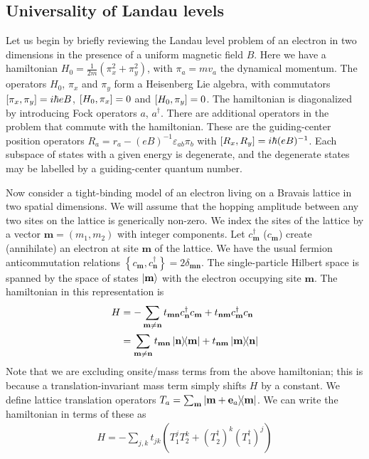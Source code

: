 \documentclass[aps,prb,twocolumn,letterpaper,twoside,nobalancelastpage,groupedaddress,amsmath,amssymb,floatfix,citeautoscript]{revtex4-1}
\begin{document}
\subsection{Universality of Landau levels}
Let us begin by briefly reviewing the Landau level problem of an electron in two dimensions in the presence of a uniform magnetic field $B$. Here we have a hamiltonian $H_0 = \frac{1}{2m}\left(\pi_x^2 + \pi_y^2\right)$, with $\pi_a = m v_a$ the dynamical momentum. The operators $H_0$, $\pi_x$ and $\pi_y$ form a Heisenberg Lie algebra, with commutators $\comm{\pi_x}{\pi_y} = i\hbar e B$, $\comm{H_0}{\pi_x} = 0$ and $\comm{H_0}{\pi_y} = 0$. The hamiltonian is diagonalized by introducing Fock operators $a$, $a^{\dagger}$. There are additional operators in the problem that commute with the hamiltonian. These are the guiding-center position operators $R_a = r_a - (eB)^{-1}\varepsilon_{ab}\pi_b$ with $\comm{R_x}{R_y} = i\hbar(eB)^{-1}$. Each subspace of states with a given energy is degenerate, and the degenerate states may be labelled by a guiding-center quantum number.

Now consider a tight-binding model of an electron living on a Bravais lattice in two spatial dimensions. 
We will assume that the hopping amplitude between any two sites on the lattice is generically non-zero. We index the sites of the lattice by a vector $\mathbf{m} = (m_1, m_2)$ with integer components. Let $c^{\dag}_{\mathbf{m}}$ ($c_{\mathbf{m}}$) create (annihilate) an electron at site $\mathbf{m}$ of the lattice. We have the usual fermion anticommutation relations $\left\{c_{\mathbf{m}},c_{\mathbf{n}}^{\dag}\right\} = 2\delta_{\mathbf{m} \mathbf{n}}$. The single-particle Hilbert space is spanned by the space of states $\ket{\mathbf{m}}$ with the electron occupying site $\mathbf{m}$. The hamiltonian in this representation is
\begin{align*}
H &= -\sum_{\mathbf{m}\neq \mathbf{n}} t_{\mathbf{m}\mathbf{n}} c^{\dag}_\mathbf{n} c_\mathbf{m}  + t_{\mathbf{n}\mathbf{m}} c^{\dag}_{\mathbf{m}} c_{\mathbf{n}}\\  &= \sum_{\mathbf{m}\neq \mathbf{n}} t_{\mathbf{m}\mathbf{n}} \dyad{\mathbf{n}}{\mathbf{m}} + t_{\mathbf{n}\mathbf{m}} \dyad{\mathbf{m}}{\mathbf{n}}
\end{align*}
Note that we are excluding onsite/mass terms from the above hamiltonian; this is because a translation-invariant mass term simply shifts $H$ by a constant. We define lattice translation operators $T_a = \sum_{\bfm} \dyad{\mathbf{m} + \mathbf{e}_a}{\mathbf{m}}$. We can write the hamiltonian in terms of these as
\begin{align}
\label{eq-b0-lattice-hamiltonian}
H = -\sum_{j,k} t_{jk} \left(T_1^j T_2^k + (T^{\dag}_2)^{k} (T^{\dag}_1)^{j}\right)
\end{align}
\end{document}
